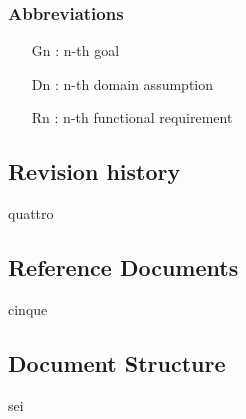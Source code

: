 \subsubsection{Abbreviations}
\begin{itemize}
\item [Gn]: n-th goal
\item [Dn]: n-th domain assumption
\item [Rn]: n-th functional requirement
\end{itemize}
\subsection{Revision history}
quattro
\subsection{Reference Documents}
cinque
\subsection{Document Structure}
sei
